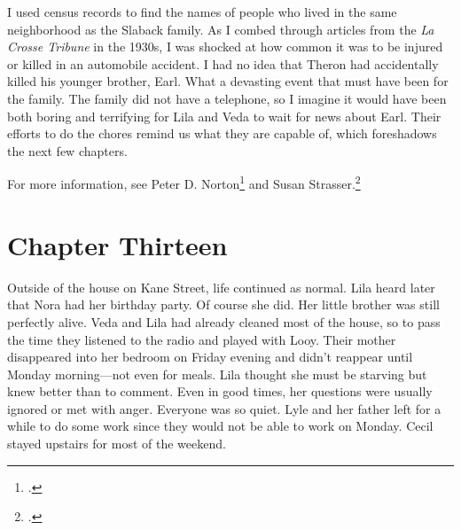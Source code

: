 \documentclass[
  american,
  letterpaper,
]{book}
\begin{document}
I used census records to find the names of people who lived in the same
neighborhood as the Slaback family. As I combed through articles from
the \emph{La Crosse Tribune} in the 1930s, I was shocked at how common
it was to be injured or killed in an automobile accident. I had no idea
that Theron had accidentally killed his younger brother, Earl. What a
devasting event that must have been for the family. The family did not
have a telephone, so I imagine it would have been both boring and
terrifying for Lila and Veda to wait for news about Earl. Their efforts
to do the chores remind us what they are capable of, which foreshadows
the next few chapters.

For more information, see Peter D. Norton\footnote{.} and Susan Strasser.\footnote{.}


\chapter{Chapter Thirteen}\label{chapter-thirteen}

Outside of the house on Kane Street, life continued as normal. Lila
heard later that Nora had her birthday party. Of course she did. Her
little brother was still perfectly alive. Veda and Lila had already
cleaned most of the house, so to pass the time they listened to the
radio and played with Looy. Their mother disappeared into her bedroom on
Friday evening and didn't reappear until Monday morning---not even for
meals. Lila thought she must be starving but knew better than to
comment. Even in good times, her questions were usually ignored or met
with anger. Everyone was so quiet. Lyle and her father left for a while
to do some work since they would not be able to work on Monday. Cecil
stayed upstairs for most of the weekend.
\end{document}
